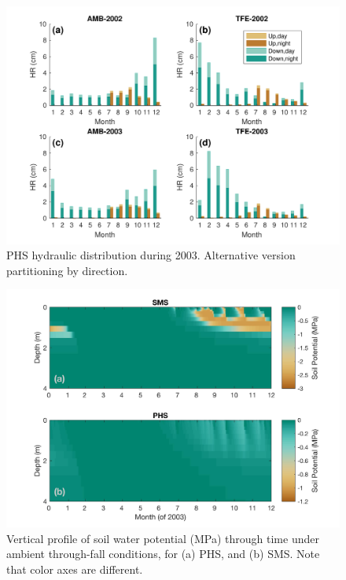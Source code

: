\documentclass[draft,linenumbers]{agujournal}
\begin{document}
      \begin{figure}[h]
     \centering
     \includegraphics[width=30pc]{../figs3/hr2}
     \caption{PHS hydraulic distribution during 2003. Alternative version partitioning by direction.}
     \label{supp:hr}
  \end{figure}
  \clearpage

  
        \clearpage
    \begin{figure}[h]
     \centering
     \includegraphics[width=30pc]{../figs3/suppsmp.jpg}
     \caption{Vertical profile of soil water potential (MPa) through time under ambient through-fall conditions, for
     (a) PHS, and 
     (b) SMS.
     Note that color axes are different. }
     \label{supp:sm}
  \end{figure}
  
\end{document}
